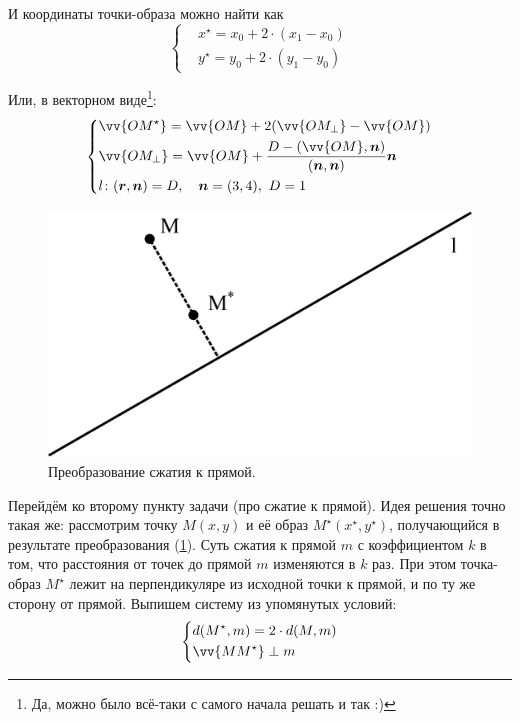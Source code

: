 \documentclass[a4paper,12pt]{article}
\begin{document}
\begin{solution}
    И координаты точки-образа можно найти как
    \[
      \left\{
        \begin{aligned}
          &x^\star = x_0 + 2 \cdot (x_1 - x_0)\\
          &y^\star = y_0 + 2 \cdot (y_1 - y_0)
        \end{aligned}
      \right.
    \]
    
    Или, в векторном виде\footnote{Да, можно было всё-таки с самого начала решать и так :)}:
    \[
      \left\{
        \begin{aligned}
          &\vv{OM^\star} = \vv{OM} + 2 (\vv{OM_{\perp}} - \vv{OM})\\
          &\vv{OM_{\perp}} = \vv{OM} + \frac{D - (\vv{OM}, \bds n)}{(\bds n, \bds n)} \bds n\\
          &l\colon (\bds r, \bds n) = D,\quad \bds n = (3, 4),\ D = 1
        \end{aligned}
      \right.
    \]
    
    \bigskip
    
    \begin{figure}
      \centering
      
      \includegraphics[width=0.5\columnwidth]{compressione-linea}
      
      \caption{Преобразование сжатия к прямой.}
      \label{fig:compressione-linea}
    \end{figure}
    
    Перейдём ко второму пункту задачи (про сжатие к прямой).
    Идея решения точно такая же: рассмотрим точку $M(x, y)$ и её образ $M^\star(x^\star, y^\star)$, получающийся в результате преобразования (\ref{fig:compressione-linea}).
    Суть сжатия к прямой $m$ с коэффициентом $k$ в том, что расстояния от точек до прямой $m$ изменяются в $k$ раз.
    При этом точка-образ $M^\star$ лежит на перпендикуляре из исходной точки к прямой, и по ту же сторону от прямой.
    Выпишем систему из упомянутых условий:
    \[
      \left\{
        \begin{aligned}
          &d(M^\star, m) = 2 \cdot d(M, m)\\
          &\vv{M M^\star} \perp m\\
        \end{aligned}
      \right.
    \]
    

\end{solution}
\end{document}
